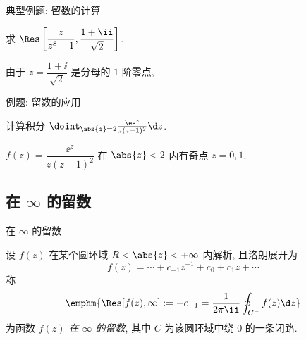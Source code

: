 \begin{frame}{典型例题: 留数的计算}
	\onslide<+->
	\begin{example}[nearnext]
		求 $\Res\left[\dfrac{z}{z^8-1},\dfrac{1+\ii}{\sqrt2}\right]$.
	\end{example}
	\onslide<+->
	\begin{solution}[nearprev]
		由于 $z=\dfrac{1+\ii}{\sqrt2}$ 是分母的 $1$ 阶零点,
		\onslide<+->{%
			因此
			\[
				\Res\left[\frac z{z^8-1},\frac{1+\ii}{\sqrt2}\right]
				=\frac z{(z^8-1)'}\Big|_{z=\frac{1+\ii}{\sqrt2}}
				=\frac z{8z^7}\Big|_{z=\frac{1+\ii}{\sqrt2}}
				=\frac \ii8.
			\]
		}
	\end{solution}
\end{frame}


\begin{frame}{例题: 留数的应用}
	\onslide<+->
	\begin{example}[nearnext]
		计算积分 $\doint_{\abs{z}=2}\frac{\ee^z}{z(z-1)^2}\d z$.
	\end{example}
	\onslide<+->
	\begin{solution}[nearprev]
		$f(z)=\dfrac{\ee^z}{z(z-1)^2}$ 在 $\abs{z}<2$ 内有奇点 $z=0,1$.
		\bigdel
	\end{solution}
\end{frame}


\subsection{在 \texorpdfstring{$\infty$}{∞} 的留数}

\begin{frame}{在 $\infty$ 的留数}
	\onslide<+->
	\begin{definition}
		设 $f(z)$ 在某个圆环域 $R<\abs{z}<+\infty$ 内解析, 且洛朗展开为
		\[
			f(z)=\cdots+c_{-1}z^{-1}+c_0+c_1z+\cdots
		\]
		称
		\[
			\emphm{\Res[f(z),\infty]:=-c_{-1}=\frac1{2\pi\ii}\oint_{C^-}f(z)\d z}
		\]
		为函数 \emph{$f(z)$ 在 $\infty$ 的留数}, 其中 $C$ 为该圆环域中绕 $0$ 的一条闭路.
	\end{definition}
\end{frame}


